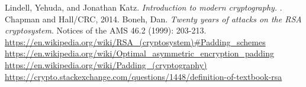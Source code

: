 \documentclass{article}
\begin{document}
 \begin{thebibliography}{999}
 	
 		Lindell, Yehuda, and Jonathan Katz.
 	\emph{ Introduction to modern cryptography. }.
         Chapman and Hall/CRC, 2014.
 	Boneh, Dan. 
 	\emph{Twenty years of attacks on the RSA cryptosystem}. 
 	Notices of the AMS 46.2 (1999): 203-213.
 	\url{https://en.wikipedia.org/wiki/RSA_(cryptosystem)#Padding_schemes}
 	\url{https://en.wikipedia.org/wiki/Optimal_asymmetric_encryption_padding}
 	\url{https://en.wikipedia.org/wiki/Padding_(cryptography)}
 	\url{ https://crypto.stackexchange.com/questions/1448/definition-of-textbook-rsa}
 	
 \end{thebibliography}
  
\end{document}
